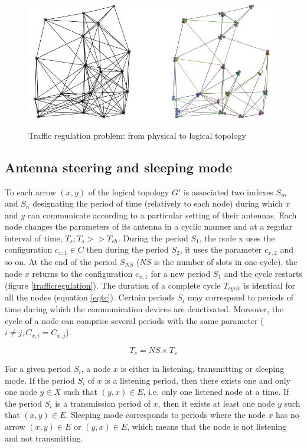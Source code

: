 \documentclass[letterpaper, 10 pt, conference]{ieeeconf}
\begin{document}
\begin{figure}[h]
\centering
\includegraphics[width=\columnwidth]{logicaltopology.png}
\caption{Traffic regulation problem: from physical to logical topology}
\label{logicaltopology}
\end{figure}

\subsection{Antenna steering and sleeping mode}
To each arrow $ (x, y) $ of the logical topology $ G '$ is associated two indexes $S_m$ and $S_n$ designating the period of time (relatively to each node) during which $ x $ and $ y $ can communicate according to a particular setting of their antennas. Each node changes the parameters of its antenna in a cyclic manner and at a regular interval of time, $ T_{s}; T_{s}>>T_{ch}$. During the period $ S_1 $, the node x uses the configuration $c_{x,1} \in C $ then during the period $ S_2 $, it uses the parameter $ c_{x,2} $ and so on. At the end of the period $ S_{NS} $ ($ NS $ is the number of slots in one cycle), the node $x$ returns to the configuration $ c_{x,1} $ for a new period $ S_1 $ and the cycle restarts (figure \ref{trafficregulation}). The duration of a complete cycle $ T_{cycle} $ is identical for all the nodes (equation \ref{eqtc}). Certain periods $ S_i $ may correspond to periods of time during which the communication devices are deactivated. Moreover, the cycle of a node can comprise several periods with the same parameter ($ i \neq j, C_{x,i} = C_{x,j} $).

\begin{dmath}
T_{c}=NS \times T_{s}
\label{eqtc}
\end{dmath}


For a given period $ S_i $, a node $ x $ is either in listening, transmitting or sleeping mode. If the period $ S_i $ of $ x $ is a listening period, then there exists one and only one node $ y \in X $ such that $ (y, x) \in E $, i.e. only one listened node at a time. If the period $ S_i $ is a transmission period of $ x $, then it exists at least one node $ y $ such that $ (x, y) \in E $. Sleeping mode corresponds to periods where the node $x$ has no arrow $(x,y) \in E$ or $(y,x) \in E$, which means that the node is not listening and not transmitting.
\end{document}
